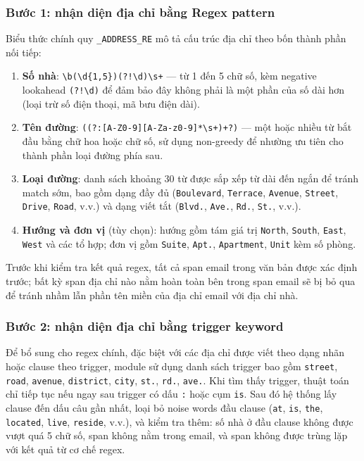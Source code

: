 \subsubsection*{Bước 1: nhận diện địa chỉ bằng Regex pattern}
Biểu thức chính quy \texttt{\_ADDRESS\_RE} mô tả cấu trúc địa chỉ theo bốn
thành phần nối tiếp:

\begin{enumerate}[nosep]
    \item \textbf{Số nhà}: \verb|\b(\d{1,5})(?!\d)\s+| ---
          từ 1 đến 5 chữ số, kèm negative lookahead \verb|(?!\d)| để đảm
          bảo đây không phải là một phần của số dài hơn (loại trừ số điện
          thoại, mã bưu điện dài).

    \item \textbf{Tên đường}: \verb|((?:[A-Z0-9][A-Za-z0-9]*\s+)+?)| ---
          một hoặc nhiều từ bắt đầu bằng chữ hoa hoặc chữ số, sử dụng
          non-greedy để nhường ưu tiên cho thành phần loại đường phía sau.

    \item \textbf{Loại đường}: danh sách khoảng 30 từ được sắp xếp từ dài
          đến ngắn để tránh match sớm, bao gồm dạng đầy đủ
          (\texttt{Boulevard}, \texttt{Terrace}, \texttt{Avenue},
          \texttt{Street}, \texttt{Drive}, \texttt{Road}, v.v.) và dạng viết
          tắt (\texttt{Blvd.}, \texttt{Ave.}, \texttt{Rd.}, \texttt{St.}, v.v.).

    \item \textbf{Hướng và đơn vị} (tùy chọn):
          hướng gồm tám giá trị \texttt{North}, \texttt{South}, \texttt{East},
          \texttt{West} và các tổ hợp; đơn vị gồm \texttt{Suite},
          \texttt{Apt.}, \texttt{Apartment}, \texttt{Unit} kèm số phòng.
\end{enumerate}

Trước khi kiểm tra kết quả regex, tất cả span email trong văn bản được xác định
trước; bất kỳ span địa chỉ nào nằm hoàn toàn bên trong span email sẽ bị bỏ qua
để tránh nhầm lẫn phần tên miền của địa chỉ email với địa chỉ nhà.

\subsubsection*{Bước 2: nhận diện địa chỉ bằng trigger keyword}
Để bổ sung cho regex chính, đặc biệt với các địa chỉ được viết theo dạng nhãn
hoặc clause theo trigger, module sử dụng danh sách
trigger bao gồm \texttt{street}, \texttt{road}, \texttt{avenue},
\texttt{district}, \texttt{city}, \texttt{st.}, \texttt{rd.}, \texttt{ave.}.
Khi tìm thấy trigger, thuật toán chỉ tiếp tục nếu ngay sau trigger có dấu
\texttt{:} hoặc cụm \texttt{is}. Sau đó hệ thống lấy clause đến dấu câu gần
nhất, loại bỏ noise words đầu clause (\texttt{at}, \texttt{is},
\texttt{the}, \texttt{located}, \texttt{live}, \texttt{reside}, v.v.), và kiểm
tra thêm: số nhà ở đầu clause không được vượt quá 5 chữ số, span không nằm
trong email, và span không được trùng lặp với kết quả từ cơ chế regex.

